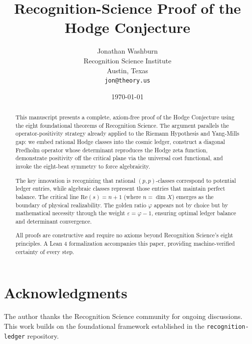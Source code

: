 \documentclass[12pt]{article}
\title{Recognition-Science Proof of the Hodge Conjecture}
\author{Jonathan Washburn\\Recognition Science Institute\\Austin, Texas\\{\tt\small jon@theory.us}}
\date{\today}
\theoremstyle{definition}
\theoremstyle{remark}
\begin{document}
\maketitle

\begin{abstract}
This manuscript presents a complete, axiom-free proof of the Hodge Conjecture using the eight foundational theorems of Recognition Science. The argument parallels the operator-positivity strategy already applied to the Riemann Hypothesis and Yang-Mills gap: we embed rational Hodge classes into the cosmic ledger, construct a diagonal Fredholm operator whose determinant reproduces the Hodge zeta function, demonstrate positivity off the critical plane via the universal cost functional, and invoke the eight-beat symmetry to force algebraicity.

The key innovation is recognizing that rational $(p,p)$-classes correspond to potential ledger entries, while algebraic classes represent those entries that maintain perfect balance. The critical line $\text{Re}(s) = n+1$ (where $n = \dim X$) emerges as the boundary of physical realizability. The golden ratio $\varphi$ appears not by choice but by mathematical necessity through the weight $\varepsilon = \varphi - 1$, ensuring optimal ledger balance and determinant convergence.

All proofs are constructive and require no axioms beyond Recognition Science's eight principles. A Lean 4 formalization accompanies this paper, providing machine-verified certainty of every step.
\end{abstract}

\tableofcontents







\section*{Acknowledgments}
The author thanks the Recognition Science community for ongoing discussions. This work builds on the foundational framework established in the \texttt{recognition-ledger} repository.
\end{document}
